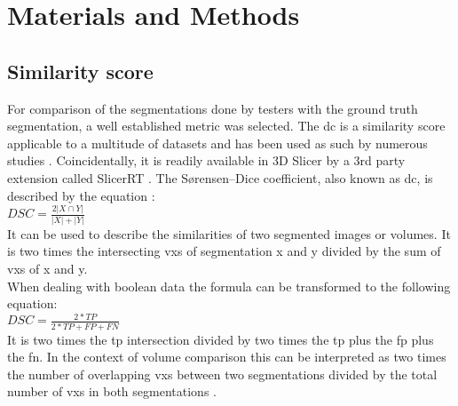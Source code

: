 
\chapter{Materials and Methods}
\label{c:mm}


\section{Similarity score}
\label{s:similarity-score}
For comparison of the segmentations done by testers with the ground truth segmentation, a well established metric was selected.
The \acrfull{dc} is a similarity score applicable to a multitude of datasets and has been used as such by numerous studies \cite{setiawanImageSegmentationMetrics2020,atasPerformanceEvaluationJaccardDice2023}.
Coincidentally, it is readily available in 3D Slicer by a 3rd party extension called SlicerRT \cite{pinterSlicerRTRadiationTherapy2012}.
The S\o{}rensen–Dice coefficient, also known as \acrfull{dc}, is described by the equation \cite{diceMeasuresAmountEcologic1945}:\\
\begin{math}
	DSC=\frac{2|X\cap Y|}{|X|+|Y|}
\end{math}\\
It can be used to describe the similarities of two segmented images or volumes.
It is two times the intersecting \glspl{vx} of segmentation x and y divided by the sum of \glspl{vx} of x and y.\\
When dealing with boolean data the formula can be transformed to the following equation:\\
\begin{math}
	DSC=\frac{2*TP}{2*TP+FP+FN}
\end{math} \\
It is two times the \acrfull{tp} intersection divided by two times the \acrlong{tp} plus the \acrfull{fp} plus the \acrfull{fn}.
In the context of volume comparison this can be interpreted as two times the number of overlapping \glspl{vx} between two segmentations divided by the total number of \glspl{vx} in both segmentations \cite{schelbComparisonProstateMRI2021}.


